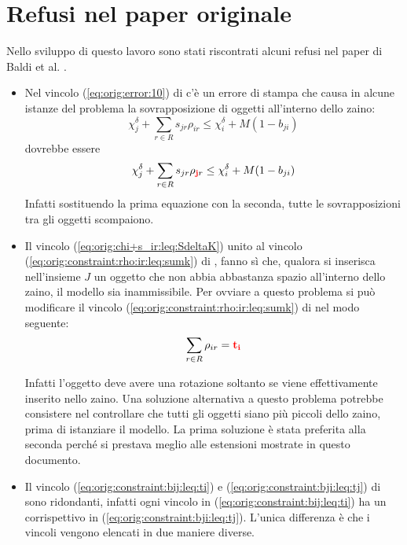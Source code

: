 \section{Refusi nel paper originale}
\label{sec:refusi}
Nello sviluppo di questo lavoro sono stati riscontrati alcuni refusi nel paper 
di Baldi et al. \cite{Baldi20129802}.
\begin{itemize}
	\item Nel vincolo (\ref{eq:orig:error:10}) di \cite{Baldi20129802} c'è un errore di stampa che 
	causa in alcune istanze del problema
	la sovrapposizione di oggetti all'interno dello zaino:
	$$
	\chi_j^\delta + \sum_{r\in R} s_{jr}\rho_{ir} \leq \chi_i^\delta + M(1-b_{ji})
	$$
	dovrebbe essere 
	$$
	\chi_j^\delta + \sum_{r\in R} s_{jr}\rho_{\mathbf{\color{red}j}r} \leq \chi_i^\delta + M(1-b_{ji})
	$$
	Infatti sostituendo la prima equazione con la seconda, tutte le 
	sovrapposizioni tra gli oggetti scompaiono.
	
	\item Il vincolo (\ref{eq:orig:chi+s_ir:leq:SdeltaK}) unito al vincolo 
	(\ref{eq:orig:constraint:rho:ir:leq:sumk})
	di \cite{Baldi20129802}, 
	fanno sì che, qualora si inserisca nell'insieme $J$ un oggetto che non abbia
	abbastanza spazio all'interno dello zaino, il modello sia inammissibile.
	Per ovviare a questo problema si può modificare il vincolo 
	(\ref{eq:orig:constraint:rho:ir:leq:sumk}) 
	di \cite{Baldi20129802} nel modo seguente:
	$$
	\sum_{r \in R} \rho_{ir} = \color{red}\mathbf{t_i}
	$$
	
	
	Infatti l'oggetto deve avere una rotazione soltanto se viene effettivamente
	inserito nello zaino.
	Una soluzione alternativa a questo problema potrebbe consistere nel 
	controllare che tutti gli oggetti siano più piccoli dello zaino, 
	prima di istanziare il modello.
	La prima soluzione è stata preferita alla seconda perché si prestava meglio
	alle estensioni mostrate in questo documento.
	\item Il vincolo (\ref{eq:orig:constraint:bij:leq:ti}) e 
	(\ref{eq:orig:constraint:bji:leq:tj}) di \cite{Baldi20129802} sono ridondanti, 
	infatti ogni vincolo in (\ref{eq:orig:constraint:bij:leq:ti}) ha un 
	corrispettivo in (\ref{eq:orig:constraint:bji:leq:tj}). L'unica differenza
	è che i vincoli vengono elencati in due maniere diverse. 
\end{itemize}

